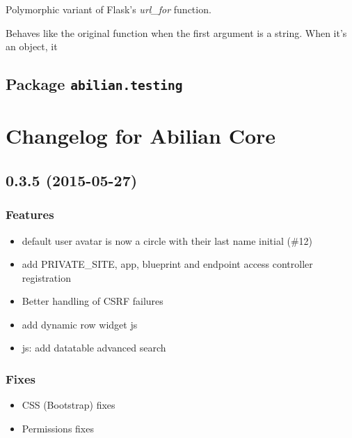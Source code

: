 \documentclass[a4paper,12pt,english]{sphinxmanual}
\begin{document}

\begin{fulllineitems}
\label{api:abilian.web.util.url_for}
Polymorphic variant of Flask's \emph{url\_for} function.

Behaves like the original function when the first argument is a string.
When it's an object, it

\end{fulllineitems}



\section{Package \texttt{abilian.testing}}
\label{api:package-abilian-testing}

\chapter{Changelog for Abilian Core}
\label{changelog::doc}\label{changelog:changelog-for-abilian-core}

\section{0.3.5 (2015-05-27)}
\label{changelog:id1}

\subsection{Features}
\label{changelog:features}\begin{itemize}
\item {} 
default user avatar is now a circle with their last name initial (\#12)

\item {} 
add PRIVATE\_SITE, app, blueprint and endpoint access controller registration

\item {} 
Better handling of CSRF failures

\item {} 
add dynamic row widget js

\item {} 
js: add datatable advanced search

\end{itemize}


\subsection{Fixes}
\label{changelog:fixes}\begin{itemize}
\item {} 
CSS (Bootstrap) fixes

\item {} 
Permissions fixes

\end{itemize}
\end{document}
